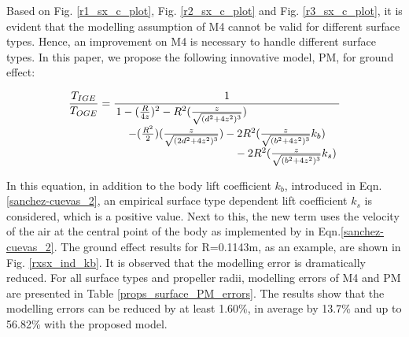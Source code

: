 \documentclass[twocolumn,10pt]{asme2ej}
\begin{document}
\begin{table}[!b]
  \small\sf\centering
  \caption{Error comparison between M4 and the data samples for each surface type for the 3 propeller radii.}
  \label{props_surface_m4_errors}
\end{table}

Based on Fig. \ref{r1_sx_c_plot}, Fig. \ref{r2_sx_c_plot} and Fig. \ref{r3_sx_c_plot}, it is evident that the modelling assumption of M4 cannot be valid for different surface types. Hence, an improvement on M4 is necessary to handle different surface types. In this paper, we propose the following innovative model, PM, for ground effect:

\begin{align}
  \frac{T_{IGE}}{T_{OGE}} = \frac{1}{\splitfrac{1 - (\frac{R}{4z})^{2} - R^{2}(\frac{z}{\sqrt{(d^{2}+4z^{2})^{3}}})} {\splitfrac{- (\frac{R^{2}}{2})(\frac{z}{\sqrt{(2d^{2}+4z^{2})^{3}}}) - 2R^{2}(\frac{z}{\sqrt{(b^{2}+4z^{2})^{3}}}k_{b})}{- 2R^{2}(\frac{z}{\sqrt{(b^{2}+4z^{2})^{3}}}k_{s})}}}  \label{sanchez-cuevas_3}
\end{align}

In this equation, in addition to the body lift coefficient $k_{b}$, introduced in Eqn.\eqref{sanchez-cuevas_2}, an empirical surface type dependent lift coefficient $k_{s}$ is considered, which is a positive value. Next to this, the new term uses the velocity of the air at the central point of the body as implemented by \cite{Sanchez-Cuevas2017} in Eqn.\eqref{sanchez-cuevas_2}.
The ground effect results for R=0.1143m, as an example, are shown in Fig. \ref{rxsx_ind_kb}. It is observed that the modelling error is dramatically reduced. For all surface types and propeller radii, modelling errors of M4 and PM are presented in Table \ref{props_surface_PM_errors}. The results show that the modelling errors can be reduced by at least 1.60\%, in average by 13.7\% and up to 56.82\% with the proposed model.
\end{document}
